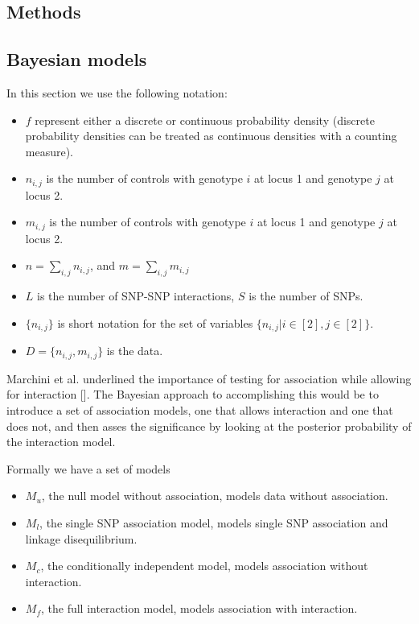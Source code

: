 \documentclass{bioinfo}
\begin{document}
\begin{methods}
\section{Methods}
\subsection{Bayesian models}
In this section we use the following notation:
\begin{itemize}
\item $f$ represent either a discrete or continuous probability density (discrete probability densities can be treated as continuous densities with a counting measure).
\item $n_{i,j}$ is the number of controls with genotype $i$ at locus 1 and genotype $j$ at locus 2.
\item $m_{i,j}$ is the number of controls with genotype $i$ at locus 1 and genotype $j$ at locus 2.
\item $n = \sum_{i,j} n_{i,j}$, and $m = \sum_{i,j} m_{i,j}$
\item $L$ is the number of SNP-SNP interactions, $S$ is the number of SNPs.
\item $\{ n_{i,j} \}$ is short notation for the set of variables $\{ n_{i,j} | i \in [2], j \in [2] \}$.
\item $D = \{ n_{i,j}, m_{i,j} \}$ is the data.
\end{itemize}

Marchini et al. underlined the importance of testing for association while allowing for interaction []. The Bayesian approach to accomplishing this would be to introduce a set of association models, one that allows interaction and one that does not, and then asses the significance by looking at the posterior probability of the interaction model.

Formally we have a set of models
\begin{itemize}
\item $M_u$, the null model without association, models data without association.
\item $M_l$, the single SNP association model, models single SNP association and linkage disequilibrium.
\item $M_c$, the conditionally independent model, models association without interaction.
\item $M_f$, the full interaction model, models association with interaction.
\end{itemize}


\end{methods}
\end{document}
